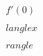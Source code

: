 \documentclass[preview]{standalone}
\begin{document}
\begin{align*}
f'(0)\\\\langle x \\\\rangle
\end{align*}
\end{document}
